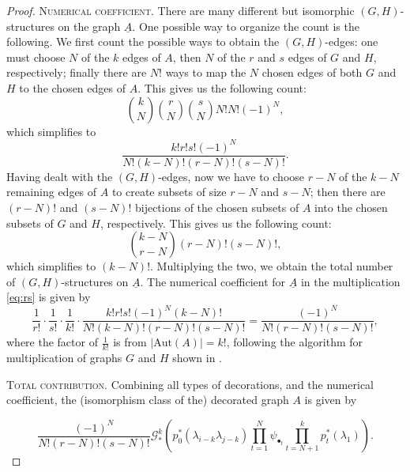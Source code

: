 \documentclass[leqno,12pt]{amsart}
\theoremstyle{remark}
\numberwithin{equation}{section}
\begin{document}
\begin{proof}
\noindent\textsc{Numerical coefficient.}
There are many different but isomorphic $(G, H)$-structures on the graph $\underline{A}$. One possible way to organize the count is the following.
We first count the possible ways to obtain the $(G, H)$-edges: one must choose $N$ of the $k$ edges of $A$, then  $N$ of the $r$ and $s$ edges of $G$ and $H$, respectively; finally there are $N!$ ways to map the $N$ chosen edges of both $G$  and $H$ to the chosen edges of $A$. This gives us the following  count:
$$
\binom{k}{N}\binom{r}{N}\binom{s}{N}N!N!(-1)^{N},
$$
which simplifies to
$$
\frac{k!r!s!(-1)^{N}}{N!(k-N)!(r-N)!(s-N)!}.
$$
Having dealt with the $(G, H)$-edges, now we have to choose $r-N$ of the $k-N$ remaining edges of $A$ to create subsets of size $r-N$ and $s-N$; then there are $(r-N)!$ and $(s-N)!$ bijections of the chosen subsets of $A$ into the chosen subsets of $G$ and $H$, respectively. This gives us the following count:
$$
\binom{k-N}{r-N}(r-N)!(s-N)!,
$$
which simplifies to 
$
(k-N)!.
$
Multiplying the two, we obtain the total number of $(G,H)$-structures on $\underline{A}$.
The numerical coefficient for $\underline{A}$ in the multiplication \eqref{eq:rs} is given by
\begin{equation}
   \frac{1}{r!}\cdot \frac{1}{s!}\cdot \frac{1}{k!}\cdot\frac{k!r!s!(-1)^{N}(k-N)!}{N!(k-N)!(r-N)!(s-N)!} = \frac{(-1)^{N}}{N!(r-N)!(s-N)!},
\end{equation}
where the factor of $\frac{1}{k!}$ is from $|\text{Aut}(A)| = k!$, following the algorithm for multiplication of graphs $G$ and $H$ shown in \cite{Yang}.


\noindent\textsc{Total contribution.}
Combining all types of decorations, and the numerical coefficient, the (isomorphism class of the) decorated graph  $A$ is given by 

\begin{equation}
  \label{eq:quasithere}  
\frac{(-1)^{N}}{N!(r-N)!(s-N)!}\mathcal{G}_*^k\left(p_0^*(\lambda_{i-k}\lambda_{j-k})\prod_{t=1}^{N}\psi_{\bullet_t}\prod_{t=N+1}^kp_t^\ast(\lambda_1)\right).
\end{equation}


\end{proof}
\end{document}
